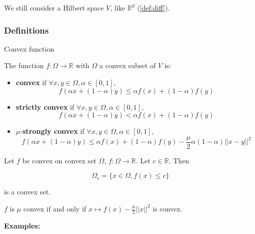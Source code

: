 \documentclass[
10pt, %
a4paper, %
oneside, %
headinclude,footinclude, %
BCOR5mm, %
]{scrartcl}
\begin{document}
We still consider a Hilbert space $V$, like $ \mathbb{R}^d$ (\ref{def:diff}).

\subsubsection{\large\color{Periwinkle}Definitions}

\begin{definition}{Convex function}
    \label{def:convexity}

    The function $f:\Omega \rightarrow \mathbb{R} $ with $\Omega$ a convex subset of $V$ is:
    \begin{itemize}
	\item \textbf{{convex}} if $\forall x, y\in \Omega, \alpha\in [0,1]$,
	    \begin{equation*}
		f(\alpha x+(1-\alpha)y)\leq \alpha f(x)+(1-\alpha)f(y)
	    \end{equation*}
	\item \textbf{{strictly convex}} if $\forall x, y\in \Omega, \alpha\in [0,1]$,
	    \begin{equation*}
		f(\alpha x+(1-\alpha)y)< \alpha f(x)+(1-\alpha)f(y)
	    \end{equation*}
	\item $\mu$-\textbf{{strongly convex}} if $\forall x, y\in \Omega, \alpha\in [0,1]$,
	    \begin{equation*}
		f(\alpha x+(1-\alpha)y)\leq \alpha f(x)+(1-\alpha)f(y)- \frac{\mu}{2} \alpha(1-\alpha)||x-y||^2
	    \end{equation*}
    \end{itemize}
\end{definition}

\begin{lemma} Let $f$ be convex on convex set $ \Omega$, $f:\Omega \rightarrow \mathbb{R} $.  Let $c\in \mathbb{R} $. Then

\begin{equation*}
    \Omega_c = \{x\in \Omega, f(x)\leq c\}
\end{equation*}
 
 is a convex set.
\end{lemma}

\begin{proposition}
    $f$ is $ \mu$ convex if and only if $ x\mapsto f(x)- \frac{\mu}{2} ||x||^2$ is convex.
\end{proposition}

\textbf{{Examples:}} 
\end{document}
